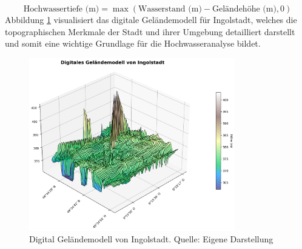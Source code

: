 \begin{equation}
    \text{Hochwassertiefe (m)} = \max \left( \text{Wasserstand (m)} - \text{Geländehöhe (m)}, 0 \right)
\end{equation}
 Abbildung \ref{fig:ingolstadt} visualisiert das digitale Geländemodell für Ingolstadt, welches die topographischen Merkmale der Stadt und ihrer Umgebung detailliert darstellt und somit eine wichtige Grundlage für die Hochwasseranalyse bildet.
\begin{figure}[!ht]
    \centering
    \includegraphics[width=0.8\textwidth]{figures/dgm_3d_wireframe_ingolstadt.png}
    \caption{Digital Geländemodell von Ingolstadt. Quelle: Eigene Darstellung}
    \label{fig:ingolstadt}
\end{figure}
\FloatBarrier